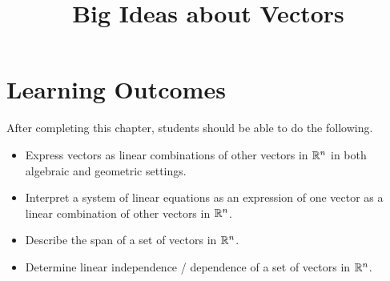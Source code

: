 \documentclass{ximera}
\title{Big Ideas about Vectors}
\begin{document}
\begin{abstract}

\end{abstract}
 
\maketitle
 
\section*{Learning Outcomes}
After completing this chapter, students should be able to do the following.
 
\begin{itemize}
    \item  Express vectors as linear combinations of other vectors in $\mathbb{R}^n$ in both algebraic and geometric settings.
    \item  Interpret a system of linear equations as an expression of one vector as a linear combination of other vectors in $\mathbb{R}^n$.
    \item Describe the span of a set of vectors in $\mathbb{R}^n$.
    \item Determine linear independence / dependence of a set of vectors in $\mathbb{R}^n$.

 
\end{itemize}

 
\end{document}
